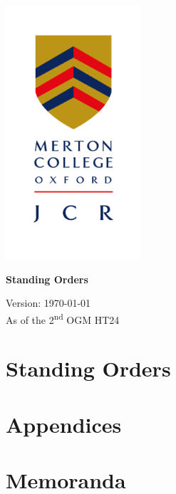 \documentclass{standingorders}
\begin{document}
	\thispagestyle{empty}
	\begin{center}
		\includegraphics[width=5cm]{mertoncollegejcr}
		\begin{vplace}[0.1] \Huge  
			\textbf{Standing Orders}
		\end{vplace}
		{ {\Large
			Version: \today}\\
			\small As of the 2\textsuperscript{nd} OGM HT24
			
		}
		\vfill
	\end{center}
	\cleardoublepage
	\frontmatter
	\tableofcontents
	
	
	\mainmatter
	\part{Standing Orders}
	
	
	
	
	
	
	
	
	
	
	
	\part{Appendices}
	\begin{appendices}
		
        
		
		
		
		
		
	\end{appendices}
	\part{Memoranda}
	\begin{appendices}
		\setcounter{chapter}{12}
		
	\end{appendices}
\end{document}
